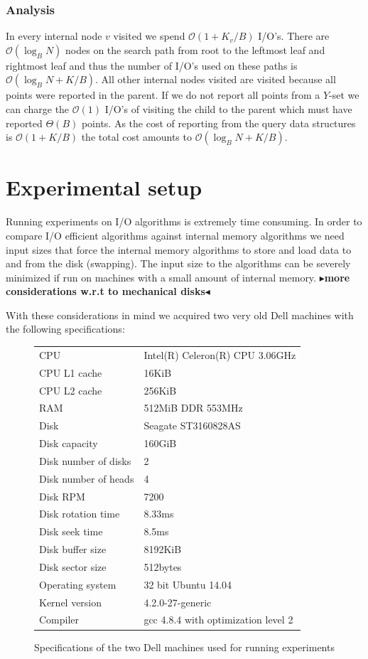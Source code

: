 \documentclass[twoside,11pt,openright]{report}
\newcommand{\todo}[1]{{\color[rgb]{.5,0,0}\textbf{$\blacktriangleright$#1$\blacktriangleleft$}}}
\begin{document}
\subsection{Analysis}
In every internal node $v$ visited we spend $\mathcal{O}(1+K_v/B)$ I/O's. There are $\mathcal{O}(\log_B N)$ nodes on the search path from root to the leftmost leaf and rightmost leaf and thus the number of I/O's used on these paths is $\mathcal{O}(\log_B N + K/B)$. All other internal nodes visited are visited because all points were reported in the parent. If we do not report all points from a $Y$-set we can charge the $\mathcal{O}(1)$ I/O's of visiting the child to the parent which must have reported $\Theta(B)$ points. As the cost of reporting from the query data structures is $\mathcal{O}(1+K/B)$ the total cost amounts to $\mathcal{O}(\log_B N + K/B)$.

\chapter{Experimental setup}
\label{chp:experimental_setup}
Running experiments on I/O algorithms is extremely time consuming. In order to compare I/O efficient algorithms against internal memory algorithms we need input sizes that force the internal memory algorithms to store and load data to and from the disk (swapping). The input size to the algorithms can be severely minimized if run on machines with a small amount of internal memory.
\todo{more considerations w.r.t to mechanical disks}

With these considerations in mind we acquired two very old Dell machines with the following specifications:

\begin{figure}[h]
\centering
\begin{tabular}{ll}
CPU & Intel(R) Celeron(R) CPU 3.06GHz \\
CPU L1 cache & 16KiB \\
CPU L2 cache & 256KiB \\
RAM & 512MiB DDR 553MHz \\
Disk & Seagate ST3160828AS \\
Disk capacity & 160GiB \\
Disk number of disks & 2 \\
Disk number of heads & 4 \\
Disk RPM & 7200 \\
Disk rotation time & 8.33ms \\
Disk seek time & 8.5ms \\
Disk buffer size & 8192KiB \\
Disk sector size & 512bytes \\
Operating system & 32 bit Ubuntu 14.04 \\
Kernel version & 4.2.0-27-generic \\
Compiler & gcc 4.8.4 with optimization level 2
\end{tabular}
\caption{Specifications of the two Dell machines used for running experiments}
\end{figure}
\end{document}
